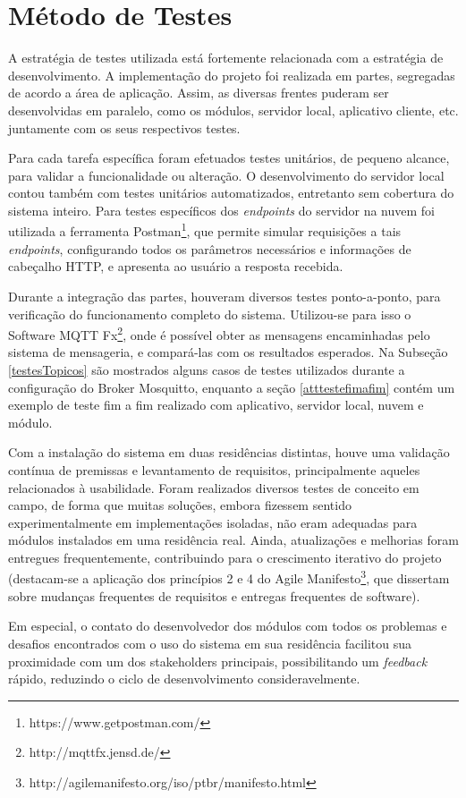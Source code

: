 \section{Método de Testes}

A estratégia de testes utilizada está fortemente relacionada com a estratégia de desenvolvimento. A implementação do projeto foi realizada em partes, segregadas de acordo a área de aplicação. Assim, as diversas frentes puderam ser desenvolvidas em paralelo, como os módulos, servidor local, aplicativo cliente, etc. juntamente com os seus respectivos testes.

Para cada tarefa específica foram efetuados testes unitários, de pequeno alcance, para validar a funcionalidade ou alteração. O desenvolvimento do servidor local contou também com testes unitários automatizados, entretanto sem cobertura do sistema inteiro. Para testes específicos dos \emph{endpoints} do servidor na nuvem foi utilizada a ferramenta Postman\footnote{https://www.getpostman.com/}, que permite simular requisições a tais \emph{endpoints}, configurando todos os parâmetros necessários e informações de cabeçalho HTTP, e apresenta ao usuário a resposta recebida.

Durante a integração das partes, houveram diversos testes ponto-a-ponto, para verificação do funcionamento completo do sistema. Utilizou-se para isso o Software MQTT Fx\footnote{http://mqttfx.jensd.de/}, onde é possível obter as mensagens encaminhadas pelo sistema de mensageria, e compará-las com os resultados esperados. Na Subseção \ref{testesTopicos} são mostrados alguns casos de testes utilizados durante a configuração do Broker Mosquitto, enquanto a seção \ref{atttestefimafim} contém um exemplo de teste fim a fim realizado com aplicativo, servidor local, nuvem e módulo.

Com a instalação do sistema em duas residências distintas, houve uma validação contínua de premissas e levantamento de requisitos, principalmente aqueles relacionados à usabilidade. Foram realizados diversos testes de conceito em campo, de forma que muitas soluções, embora fizessem sentido experimentalmente em implementações isoladas, não eram adequadas para módulos instalados em uma residência real. Ainda, atualizações e melhorias foram entregues frequentemente, contribuindo para o crescimento iterativo do projeto (destacam-se a aplicação dos princípios 2 e 4 do Agile Manifesto\footnote{http://agilemanifesto.org/iso/ptbr/manifesto.html}, que dissertam sobre mudanças frequentes de requisitos e entregas frequentes de software).

Em especial, o contato do desenvolvedor dos módulos com todos os problemas e desafios encontrados com o uso do sistema em sua residência facilitou sua proximidade com um dos stakeholders principais, possibilitando um \textit{feedback} rápido, reduzindo o ciclo de desenvolvimento consideravelmente.